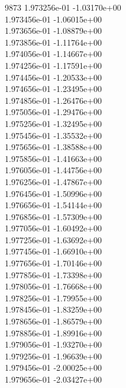 9873	1.973256e-01	-1.03170e+00	\\ 	1.973456e-01	-1.06015e+00	\\ 	1.973656e-01	-1.08879e+00	\\ 	1.973856e-01	-1.11764e+00	\\ 	1.974056e-01	-1.14667e+00	\\ 	1.974256e-01	-1.17591e+00	\\ 	1.974456e-01	-1.20533e+00	\\ 	1.974656e-01	-1.23495e+00	\\ 	1.974856e-01	-1.26476e+00	\\ 	1.975056e-01	-1.29476e+00	\\ 	1.975256e-01	-1.32495e+00	\\ 	1.975456e-01	-1.35532e+00	\\ 	1.975656e-01	-1.38588e+00	\\ 	1.975856e-01	-1.41663e+00	\\ 	1.976056e-01	-1.44756e+00	\\ 	1.976256e-01	-1.47867e+00	\\ 	1.976456e-01	-1.50996e+00	\\ 	1.976656e-01	-1.54144e+00	\\ 	1.976856e-01	-1.57309e+00	\\ 	1.977056e-01	-1.60492e+00	\\ 	1.977256e-01	-1.63692e+00	\\ 	1.977456e-01	-1.66910e+00	\\ 	1.977656e-01	-1.70146e+00	\\ 	1.977856e-01	-1.73398e+00	\\ 	1.978056e-01	-1.76668e+00	\\ 	1.978256e-01	-1.79955e+00	\\ 	1.978456e-01	-1.83259e+00	\\ 	1.978656e-01	-1.86579e+00	\\ 	1.978856e-01	-1.89916e+00	\\ 	1.979056e-01	-1.93270e+00	\\ 	1.979256e-01	-1.96639e+00	\\ 	1.979456e-01	-2.00025e+00	\\ 	1.979656e-01	-2.03427e+00	\\ \hline
